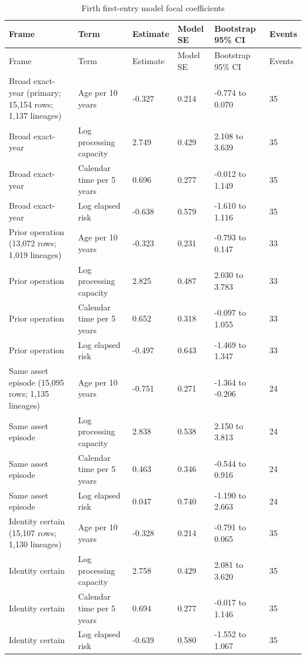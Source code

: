 \documentclass[12pt,letterpaper]{article}
\begin{document}
\clearpage
\begingroup
\scriptsize
\setlength{\tabcolsep}{2.4pt}
\renewcommand{\arraystretch}{1.10}
\setlength{\LTleft}{\fill}
\setlength{\LTright}{\fill}
\begin{longtable}{L{2.95cm}L{2.75cm}R{1.25cm}R{1.35cm}L{2.35cm}R{0.9cm}}
\caption{Firth first-entry model focal coefficients}
\label{tab:appendix-entry}\\
\toprule
Frame & Term & Estimate & Model SE & Bootstrap 95\% CI & Events \\
\midrule
\endfirsthead
\toprule
Frame & Term & Estimate & Model SE & Bootstrap 95\% CI & Events \\
\midrule
\endhead
Broad exact-year (primary; 15,154 rows; 1,137 lineages) & Age per 10 years & -0.327 & 0.214 & -0.774 to 0.070 & 35 \\
Broad exact-year & Log processing capacity & 2.749 & 0.429 & 2.108 to 3.639 & 35 \\
Broad exact-year & Calendar time per 5 years & 0.696 & 0.277 & -0.012 to 1.149 & 35 \\
Broad exact-year & Log elapsed risk & -0.638 & 0.579 & -1.610 to 1.116 & 35 \\
Prior operation (13,072 rows; 1,019 lineages) & Age per 10 years & -0.323 & 0.231 & -0.793 to 0.147 & 33 \\
Prior operation & Log processing capacity & 2.825 & 0.487 & 2.030 to 3.783 & 33 \\
Prior operation & Calendar time per 5 years & 0.652 & 0.318 & -0.097 to 1.055 & 33 \\
Prior operation & Log elapsed risk & -0.497 & 0.643 & -1.469 to 1.347 & 33 \\
Same asset episode (15,095 rows; 1,135 lineages) & Age per 10 years & -0.751 & 0.271 & -1.364 to -0.206 & 24 \\
Same asset episode & Log processing capacity & 2.838 & 0.538 & 2.150 to 3.813 & 24 \\
Same asset episode & Calendar time per 5 years & 0.463 & 0.346 & -0.544 to 0.916 & 24 \\
Same asset episode & Log elapsed risk & 0.047 & 0.740 & -1.190 to 2.663 & 24 \\
Identity certain (15,107 rows; 1,130 lineages) & Age per 10 years & -0.328 & 0.214 & -0.791 to 0.065 & 35 \\
Identity certain & Log processing capacity & 2.758 & 0.429 & 2.081 to 3.620 & 35 \\
Identity certain & Calendar time per 5 years & 0.694 & 0.277 & -0.017 to 1.146 & 35 \\
Identity certain & Log elapsed risk & -0.639 & 0.580 & -1.552 to 1.067 & 35 \\
\bottomrule
\end{longtable}
\endgroup
\end{document}
